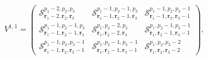\documentclass[final]{amsart}%
\newcommand{\0}{\mathaccent23}
\newcommand{\br}{\mathbf r}
\begin{document}
\begin{gather}
V^{1, 1}=
  \label{diagram-V11}
\begin{pmatrix}
\mathcal S^{p_{1}-2, p_{2}, p_{3}}_{  \br_{1}-2,  \br_{2},  \br_{3}} &\mathcal S^{p_{1}-1, p_{2}-1, p_{3}}_{  \br_{1}-1,  \br_{2}-1,  \br_{3}}&\mathcal S^{p_{1}-1, p_{2}, p_{3}-1}_{  \br_{1}-1,  \br_{2},  \br_{3}-1} \\
\mathcal S^{p_{1}-1,p_{2}-1,p_{3}}_{  \br_{1}-1, \br_{2}-1, \br_{3}}&\mathcal S^{p_{1}, p_{2}-2, p_{3}}_{  \br_{1},  \br_{2}-2,  \br_{3}}&
\mathcal S^{p_{1}, p_{2}-1, p_{3}-1}_{  \br_{1},  \br_{2}-1,  \br_{3}-1}\\
\mathcal S^{p_{1}-1, p_{2}, p_{3}-1}_{  \br_{1}-1,  \br_{2},  \br_{3}-1} & \mathcal S^{p_{1}, p_{2}-1, p_{3}-1}_{  \br_{1},  \br_{2}-1,  \br_{3}-1}& \mathcal S^{p_{1}, p_{2}, p_{3}-2}_{  \br_{1},  \br_{2},  \br_{3}-2}
\end{pmatrix},
\end{gather}
\end{document}
